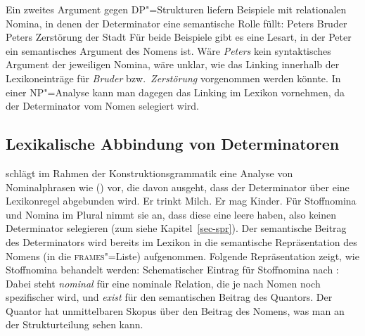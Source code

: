 Ein zweites Argument gegen DP"=Strukturen liefern Beispiele mit relationalen Nomina, in denen der
Determinator eine semantische Rolle füllt:
\eal
\ex Peters Bruder
\ex Peters Zerstörung der Stadt
\zl
Für beide Beispiele gibt es eine Lesart, in der Peter ein semantisches Argument des Nomens ist. Wäre
\emph{Peters} kein syntaktisches Argument der jeweiligen Nomina, wäre unklar, wie das Linking
innerhalb der Lexikoneinträge für \emph{Bruder} bzw.\ \emph{Zerstörung} vorgenommen werden
könnte. In einer NP"=Analyse kann man dagegen das Linking im Lexikon vornehmen, da der Determinator
vom Nomen selegiert wird.%

\subsection{Lexikalische Abbindung von Determinatoren}

\mbox{}\citet[]{Michaelis2006a} schlägt im Rahmen der
Konstruktionsgrammatik eine Analyse von Nominalphrasen wie () vor, die davon ausgeht, dass der
Determinator über eine Lexikonregel abgebunden wird.
\eal
\ex Er trinkt Milch.
\ex Er mag Kinder.
\zl
Für Stoffnomina und Nomina im  Plural nimmt sie an, dass diese eine leere \sprl haben, also keinen
Determinator selegieren (zum \sprm siehe Kapitel~\ref{sec-spr}). Der semantische Beitrag des
Determinators wird bereits im Lexikon in die semantische Repräsentation des Nomens (in die \textsc{frames}"=Liste) aufgenommen. Folgende Repräsentation zeigt, wie Stoffnomina behandelt werden:
\ea
Schematischer Eintrag für Stoffnomina nach \citet[]{Michaelis2006a}:\\
\z
Dabei steht \emph{nominal} für eine nominale Relation, die je nach Nomen noch spezifischer wird, und
\emph{exist} für den semantischen Beitrag des Quantors. Der Quantor hat unmittelbaren Skopus über
den Beitrag des Nomens, was man an der Strukturteilung  sehen kann.

